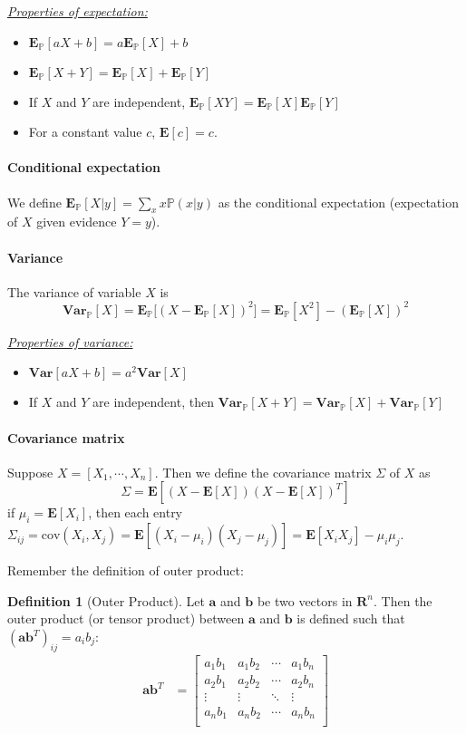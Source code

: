 \documentclass[12pt]{article}
\renewcommand{\P}{\mathbb{P}}
\newcommand{\E}{\bm{E}}
\newcommand{\Var}{\bm{Var}}
\theoremstyle{definition}
\newtheorem{definition}{Definition}[section]
\begin{document}
\underline{\textit{Properties of expectation:}}
\begin{itemize}
  \item $\E_{\P}[aX+b]=a\E_{\P}[X]+b$
  \item $\E_{\P}[X+Y]=\E_{\P}[X]+\E_{\P}[Y]$
  \item If $X$ and $Y$ are independent, $\E_{\P}[XY]=\E_{\P}[X]\E_{\P}[Y]$
  \item For a constant value $c$, $\E[c]=c$.
\end{itemize}

\paragraph{Conditional expectation} We define $\E_{\P}[X|y]=\sum_{x}x\P(x|y)$ as the conditional expectation (expectation of $X$ given evidence $Y=y$).

\paragraph{Variance} The variance of variable $X$ is
\begin{equation}
  \Var_{\P}[X]=\E_{\P}\Big[(X-\E_{\P}[X])^2\Big]=\E_{\P}[X^2]-(\E_{\P}[X])^2
\end{equation}

\underline{\textit{Properties of variance:}}
\begin{itemize}
  \item $\Var[aX+b]=a^2\Var[X]$
  \item If $X$ and $Y$ are independent, then $\Var_\P[X+Y]=\Var_\P[X]+\Var_\P[Y]$
\end{itemize}

\paragraph{Covariance matrix} Suppose $X=[X_1,\cdots,X_n]$. Then we define the covariance matrix $\Sigma$ of $X$ as
\begin{equation}
  \Sigma=\E[(X-\E[X])(X-\E[X])^T]
\end{equation}
if $\mu_i=\E[X_i]$, then each entry $\Sigma_{ij}=\text{cov}(X_i, X_j)=\E[(X_i-\mu_i)(X_j-\mu_j)]=\E[X_iX_j]-\mu_i\mu_j$.

Remember the definition of outer product:

\begin{definition}[Outer Product]
Let $\bm{a}$ and $\bm{b}$ be two vectors in $\bm{R}^n$. Then the outer product (or tensor product) between $\bm{a}$ and $\bm{b}$ is defined such that $(\bm{a}\bm{b}^T)_{ij}=a_ib_j$:
    \begin{align}
        \bm{a}\bm{b}^T&=\begin{bmatrix}
        a_1b_1 & a_1b_2 & \cdots & a_1b_n\\
        a_2b_1 & a_2b_2 & \cdots & a_2b_n\\
        \vdots & \vdots & \ddots & \vdots\\
        a_nb_1 & a_nb_2 & \cdots & a_nb_n\\
        \end{bmatrix}
    \end{align}
\end{definition}
\end{document}

